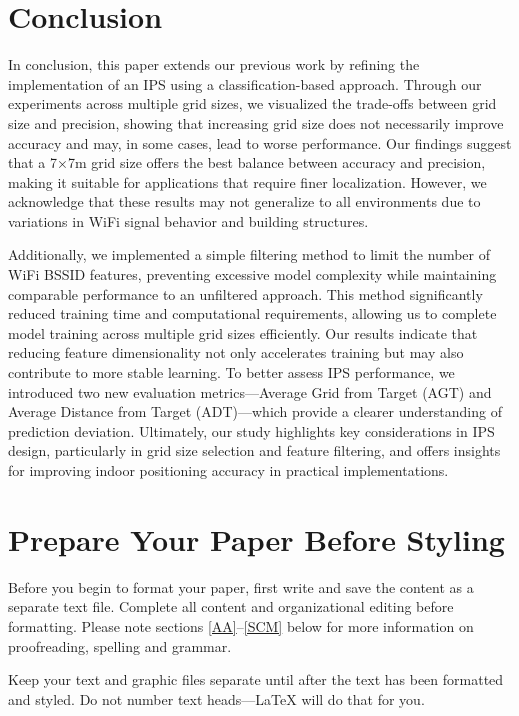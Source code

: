 \documentclass[conference]{IEEEtran}
\begin{document}
	
	
	\section{Conclusion}
	In conclusion, this paper extends our previous work by refining the implementation of an IPS using a classification-based approach. Through our experiments across multiple grid sizes, we visualized the trade-offs between grid size and precision, showing that increasing grid size does not necessarily improve accuracy and may, in some cases, lead to worse performance. Our findings suggest that a 7×7m grid size offers the best balance between accuracy and precision, making it suitable for applications that require finer localization. However, we acknowledge that these results may not generalize to all environments due to variations in WiFi signal behavior and building structures.
	
	Additionally, we implemented a simple filtering method to limit the number of WiFi BSSID features, preventing excessive model complexity while maintaining comparable performance to an unfiltered approach. This method significantly reduced training time and computational requirements, allowing us to complete model training across multiple grid sizes efficiently. Our results indicate that reducing feature dimensionality not only accelerates training but may also contribute to more stable learning. To better assess IPS performance, we introduced two new evaluation metrics—Average Grid from Target (AGT) and Average Distance from Target (ADT)—which provide a clearer understanding of prediction deviation. Ultimately, our study highlights key considerations in IPS design, particularly in grid size selection and feature filtering, and offers insights for improving indoor positioning accuracy in practical implementations.
	
	
	
	\section{Prepare Your Paper Before Styling}
	Before you begin to format your paper, first write and save the content as a 
	separate text file. Complete all content and organizational editing before 
	formatting. Please note sections \ref{AA}--\ref{SCM} below for more information on 
	proofreading, spelling and grammar.
	
	Keep your text and graphic files separate until after the text has been 
	formatted and styled. Do not number text heads---{\LaTeX} will do that 
	for you.
	
\end{document}
